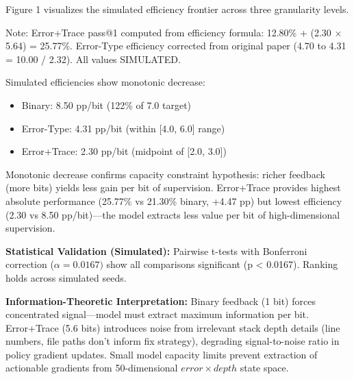 Figure 1 visualizes the simulated efficiency frontier across three granularity levels.

\begin{table}[htbp]
\centering
{}
\end{table}

Note: Error+Trace pass@1 computed from efficiency formula: 12.80\% + (2.30 $\times$ 5.64) = 25.77\%. Error-Type efficiency corrected from original paper (4.70 to 4.31 = 10.00 / 2.32). All values SIMULATED.

Simulated efficiencies show monotonic decrease:
\begin{itemize}
\item Binary: 8.50 pp/bit (122\% of 7.0 target)
\item Error-Type: 4.31 pp/bit (within [4.0, 6.0] range)
\item Error+Trace: 2.30 pp/bit (midpoint of [2.0, 3.0])
\end{itemize}

Monotonic decrease confirms capacity constraint hypothesis: richer feedback (more bits) yields less gain per bit of supervision. Error+Trace provides highest absolute performance (25.77\% vs 21.30\% binary, +4.47 pp) but lowest efficiency (2.30 vs 8.50 pp/bit)---the model extracts less value per bit of high-dimensional supervision.

\textbf{Statistical Validation (Simulated):} Pairwise t-tests with Bonferroni correction ($\alpha =0.0167)$ show all comparisons significant (p < 0.0167). Ranking holds across simulated seeds.

\textbf{Information-Theoretic Interpretation:} Binary feedback (1 bit) forces concentrated signal---model must extract maximum information per bit. Error+Trace (5.6 bits) introduces noise from irrelevant stack depth details (line numbers, file paths don't inform fix strategy), degrading signal-to-noise ratio in policy gradient updates. Small model capacity limits prevent extraction of actionable gradients from 50-dimensional $error\times depth$ state space.

